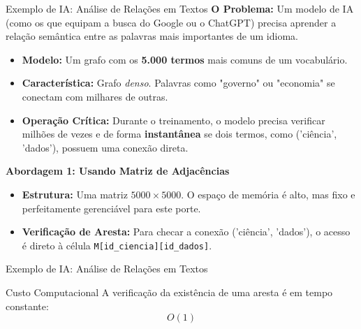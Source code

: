 \begin{frame}{Exemplo de IA: Análise de Relações em Textos}
    \textbf{O Problema:} Um modelo de IA (como os que equipam a busca do Google ou o ChatGPT) precisa aprender a relação semântica entre as palavras mais importantes de um idioma.

    \pause %
    
    \begin{itemize}
        \item \textbf{Modelo:} Um grafo com os \textbf{5.000 termos} mais comuns de um vocabulário.
        \item \textbf{Característica:} Grafo \textit{denso}. Palavras como "governo" ou "economia" se conectam com milhares de outras.
        \item \textbf{Operação Crítica:} Durante o treinamento, o modelo precisa verificar milhões de vezes e de forma \textbf{instantânea} se dois termos, como ('ciência', 'dados'), possuem uma conexão direta.
    \end{itemize}
    
    \pause %
    
    \textbf{Abordagem 1: Usando Matriz de Adjacências}
    \begin{itemize}
        \item<+-> \textbf{Estrutura:} Uma matriz $5000 \times 5000$. O espaço de memória é alto, mas fixo e perfeitamente gerenciável para este porte.
        \item<+-> \textbf{Verificação de Aresta:} Para checar a conexão ('ciência', 'dados'), o acesso é direto à célula \texttt{M[id\_ciencia][id\_dados]}.
    \end{itemize}
\end{frame}        

\begin{frame}{Exemplo de IA: Análise de Relações em Textos}
    \begin{block}{Custo Computacional}
        A verificação da existência de uma aresta é em tempo constante:
        $$ O(1) $$        
    \end{block}
\end{frame}

